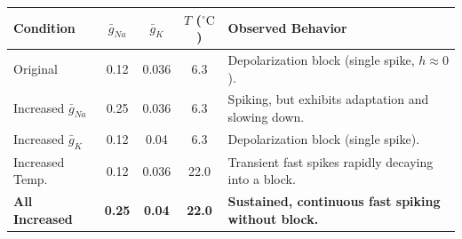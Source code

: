 \documentclass{article}
\begin{document}
\begin{answerbox}
\vspace{1em}
\begin{center}
    \label{tab:param_alt_q6}
    \begin{tabular}{@{}p{3.5cm}cccp{6cm}@{}}
    \toprule
    \textbf{Condition} & $\bar{g}_{Na}$ & $\bar{g}_K$ & $T$ ($^\circ\text{C}$) & \textbf{Observed Behavior} \\
    \midrule
    Original & 0.12 & 0.036 & 6.3 & Depolarization block (single spike, $h \approx 0$). \\
    Increased $\bar{g}_{Na}$ & 0.25 & 0.036 & 6.3 & Spiking, but exhibits adaptation and slowing down. \\
    Increased $\bar{g}_K$ & 0.12 & 0.04 & 6.3 & Depolarization block (single spike). \\
    Increased Temp. & 0.12 & 0.036 & 22.0 & Transient fast spikes rapidly decaying into a block. \\
    \textbf{All Increased} & \textbf{0.25} & \textbf{0.04} & \textbf{22.0} & \textbf{Sustained, continuous fast spiking without block.} \\
    \bottomrule
    \end{tabular}
\end{center}
\end{answerbox}
\end{document}
